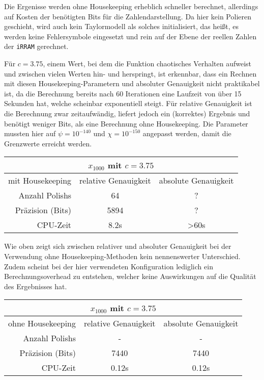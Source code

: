 Die Ergenisse werden ohne Housekeeping erheblich schneller berechnet, allerdings auf Kosten der benötigten Bits für die Zahlendarstellung. Da hier kein Polieren geschieht, wird auch kein Taylormodell als solches initialisiert, das heißt, es werden keine Fehlersymbole eingesetzt und rein auf der Ebene der reellen Zahlen der \verb+iRRAM+ gerechnet.

Für $c=3.75$, einem Wert, bei dem die Funktion chaotisches Verhalten aufweist und zwischen vielen Werten hin- und herspringt, ist erkennbar, dass ein Rechnen mit diesen Housekeeping-Parametern und absoluter Genauigkeit nicht praktikabel ist, da die Berechnung bereits nach 60 Iterationen eine Laufzeit von über 15 Sekunden hat, welche scheinbar exponentiell steigt. Für relative Genauigkeit ist die Berechnung zwar zeitaufwändig, liefert jedoch ein (korrektes) Ergebnis und benötigt weniger Bits, als eine Berechnung ohne Housekeeping. Die Parameter mussten hier auf $\psi = 10^{-140}$ und $\chi = 10^ {-150}$ angepasst werden, damit die Grenzwerte erreicht werden.

\begin{center}
\begin{tabular}{|r|c|c|}
\hline
\multicolumn{3}{|c|}{$x_{1000}$ mit $c=3.75$}\\
\hline
 mit Housekeeping &relative Genauigkeit & absolute Genauigkeit \\
 \hline
 \hline
 Anzahl Polishs & 64 & ?\\
 Präzision (Bits) & 5894 & ?\\
 CPU-Zeit & 8.2s & >60s\\
 \hline
\end{tabular}
\end{center}

Wie oben zeigt sich zwischen relativer und absoluter Genauigkeit bei der Verwendung ohne Housekeeping-Methoden kein nennenswerter Unterschied. Zudem scheint bei der hier verwendeten Konfiguration lediglich ein Berechnungsoverhead zu entstehen, welcher keine Auswirkungen auf die Qualität des Ergebnisses hat.


\begin{center}
\begin{tabular}{|r|c|c|}
\hline
\multicolumn{3}{|c|}{$x_{1000}$ mit $c=3.75$}\\
\hline
 ohne Housekeeping &relative Genauigkeit & absolute Genauigkeit \\
 \hline
 \hline
 Anzahl Polishs & - & -\\
 Präzision (Bits) & 7440 & 7440\\
 CPU-Zeit & 0.12s & 0.12s\\
 \hline
\end{tabular}
\end{center}


